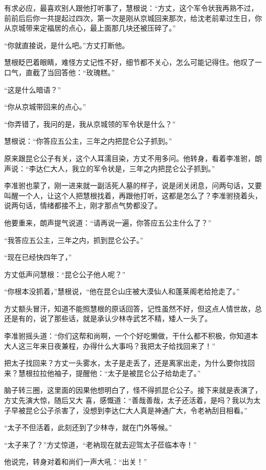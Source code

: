 有求必应，最喜欢别人跟他打听事了，慧根说：“方丈，这个军令状我再熟不过，前前后后你一共提起过四次，第一次是刚从京城回来那次，给沈老前辈过生日，你从京城带来定福居的点心，最上面那几块还被压碎了。”

“你就直接说，是什么吧。”方丈打断他。

慧根眨巴着眼睛，难怪方丈记性不好，细节都不关心，怎么可能记得住。他叹了一口气，直截了当回答他：“玫瑰糕。”

“这是什么暗语？”

“你从京城带回来的点心。”

“你弄错了，我问的是，我从京城领的军令状是什么？”

慧根说：“你答应五公主，三年之内把昆仑公子抓到。”

原来跟昆仑公子有关，这个人耳濡目染，方丈不用多问。他转身，看着李准驸，朗声说：“李达仁大人，我立的军令状是，三年之内把昆仑公子抓到。”

李准驸也蒙了，刚一进来就一副活死人墓的样子，说是闭关闭息，问两句话，又要叫醒一个人，让这个人把慧根找着，再跟他打听，这都是怎么了？李准驸挠着头，说两句话，情绪都接不上，刚才那点气势都没了。

他要重来，朗声提气说道：“请再说一遍，你答应五公主什么了？”

“我答应五公主，三年之内，抓到昆仑公子。”

“现在已经快四年了，”

方丈低声问慧根：“昆仑公子他人呢？”

“你根本没抓着，”慧根说，“他在昆仑山庄被大漠仙人和蓬莱阁老给抢走了。”

方丈额头冒汗，知道不能照慧根的原话回答，记性虽然不好，但这点人情世故，总还是有的，说了那些话，就是承认少林寺武艺不精，矮人一头了。

李准驸摇头道：“你们这帮和尚啊，一个个好吃懒做，干什么都不积极，你知道本大人这三年来日夜兼程，办得什么大事吗？我把太子给找回来了！”

把太子找回来？方丈一头雾水，太子是走丢了，还是离家出走，为什么要你找回来？慧根拉拉他袖子，提醒他：“太子是被昆仑公子给劫走了。”

脑子转三圈，这里面的因果他想明白了，怪不得抓昆仑公子。接下来就是表演了，方丈先演大惊，随后又大
喜，感慨道：“善哉善哉，太子还活着，是吗？我以为太子早被昆仑公子杀害了，没想到李达仁大人真是神通广大，令老衲刮目相看。”

“太子不但活着，此刻还到了少林寺，就在门外等候。”

“太子来了？”方丈惊道，“老衲现在就去迎驾太子莅临本寺！”

他说完，转身对着和尚们一声大吼：“出关！”

